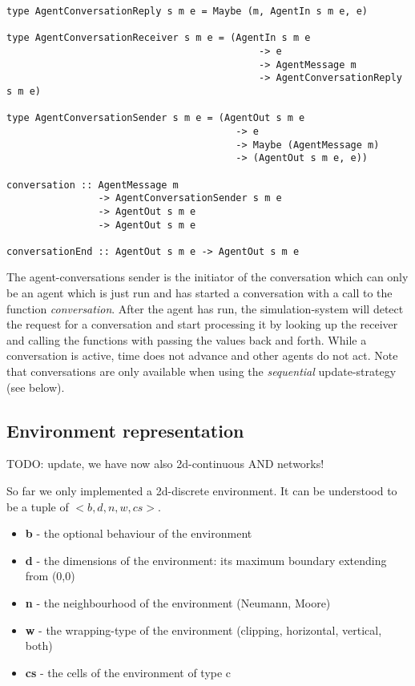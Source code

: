 \begin{verbatim}
type AgentConversationReply s m e = Maybe (m, AgentIn s m e, e)

type AgentConversationReceiver s m e = (AgentIn s m e
                                            -> e
                                            -> AgentMessage m
                                            -> AgentConversationReply s m e)

type AgentConversationSender s m e = (AgentOut s m e
                                        -> e
                                        -> Maybe (AgentMessage m)  
                                        -> (AgentOut s m e, e))
                                        
conversation :: AgentMessage m
                -> AgentConversationSender s m e
                -> AgentOut s m e
                -> AgentOut s m e

conversationEnd :: AgentOut s m e -> AgentOut s m e
\end{verbatim}

The agent-conversations sender is the initiator of the conversation which can only be an agent which is just run and has started a conversation with a call to the function \textit{conversation}. After the agent has run, the simulation-system will detect the request for a conversation and start processing it by looking up the receiver and calling the functions with passing the values back and forth. While a conversation is active, time does not advance and other agents do not act. Note that conversations are only available when using the \textit{sequential} update-strategy (see below).

\subsection{Environment representation}
TODO: update, we have now also 2d-continuous AND networks!

So far we only implemented a 2d-discrete environment. It can be understood to be a tuple of $<b, d, n, w, cs>$.
\begin{itemize}
	\item \textbf{b} - the optional behaviour of the environment
	\item \textbf{d} - the dimensions of the environment: its maximum boundary extending from (0,0)
	\item \textbf{n} - the neighbourhood of the environment (Neumann, Moore)
	\item \textbf{w} - the wrapping-type of the environment (clipping, horizontal, vertical, both)
	\item \textbf{cs} - the cells of the environment of type c
\end{itemize}

